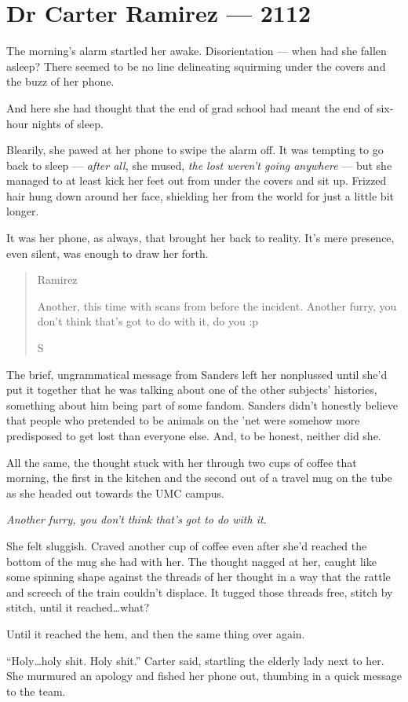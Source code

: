 \chapter*{Dr Carter Ramirez — 2112}

The morning's alarm startled her awake. Disorientation --- when had she fallen asleep? There seemed to be no line delineating squirming under the covers and the buzz of her phone.

And here she had thought that the end of grad school had meant the end of six-hour nights of sleep.

Blearily, she pawed at her phone to swipe the alarm off. It was tempting to go back to sleep --- \emph{after all,} she mused, \emph{the lost weren't going anywhere} --- but she managed to at least kick her feet out from under the covers and sit up. Frizzed hair hung down around her face, shielding her from the world for just a little bit longer.

It was her phone, as always, that brought her back to reality. It's mere presence, even silent, was enough to draw her forth.

\begin{quote}
Ramirez

Another, this time with scans from before the incident. Another furry, you don't think that's got to do with it, do you :p

S
\end{quote}

The brief, ungrammatical message from Sanders left her nonplussed until she'd put it together that he was talking about one of the other subjects' histories, something about him being part of some fandom. Sanders didn't honestly believe that people who pretended to be animals on the 'net were somehow more predisposed to get lost than everyone else. And, to be honest, neither did she.

All the same, the thought stuck with her through two cups of coffee that morning, the first in the kitchen and the second out of a travel mug on the tube as she headed out towards the UMC campus.

\emph{Another furry, you don't think that's got to do with it}.

She felt sluggish. Craved another cup of coffee even after she'd reached the bottom of the mug she had with her. The thought nagged at her, caught like some spinning shape against the threads of her thought in a way that the rattle and screech of the train couldn't displace. It tugged those threads free, stitch by stitch, until it reached\ldots{}what?

Until it reached the hem, and then the same thing over again.

``Holy\ldots{}holy shit. Holy shit.'' Carter said, startling the elderly lady next to her. She murmured an apology and fished her phone out, thumbing in a quick message to the team.
